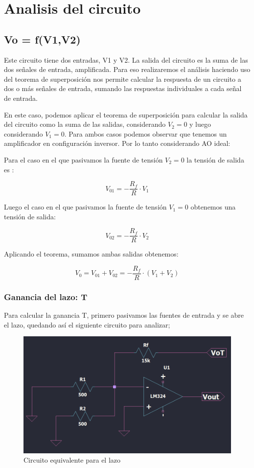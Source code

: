 \section{Analisis del circuito}

\subsection{Vo = f(V1,V2)}

Este circuito tiene dos entradas, V1 y V2. 
La salida del circuito es la suma de las dos señales de entrada, amplificada. Para eso realizaremos el análisis haciendo uso del teorema de superposición nos permite calcular la respuesta de un circuito a dos o más señales de entrada, sumando las respuestas individuales a cada señal de entrada.

En este caso, podemos aplicar el teorema de superposición para calcular la salida del circuito como la suma de las salidas, considerando $V_2=0$ y luego considerando $V_1=0$. Para ambos casos podemos observar que tenemos un amplificador en configuración inversor. Por lo tanto considerando AO ideal: 

\vspace{1em}

Para el caso en el que pasivamos la fuente de tensión $V_2 = 0$ la tensión de salida es :

\[V_{01} = - \frac{R_f}{R} \cdot V_1 \]

Luego el caso en el que pasivamos la fuente de tensión $V_1 = 0$ obtenemos una tensión de salida:

\[V_{02} = - \frac{R_f}{R} \cdot V_2 \]

Aplicando el teorema, sumamos ambas salidas obtenemos:

\[V_{0} = V_{01} + V_{02} = - \frac{R_f}{R} \cdot (V_1 + V_2) \]

\vspace{1em}

\subsubsection{Ganancia del lazo: T}
Para calcular la ganancia T, primero pasivamos las fuentes de entrada y se abre el lazo, quedando así el siguiente circuito para analizar;

\begin{figure}[h!]
    \centering
    \includegraphics[width=0.90\linewidth]{img/equivalente_lazo.png}
    \caption{Circuito equivalente para el lazo}
    \label{fig:esquematico}
\end{figure}


